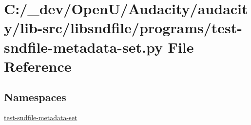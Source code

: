 \hypertarget{test-sndfile-metadata-set_8py}{}\section{C\+:/\+\_\+dev/\+Open\+U/\+Audacity/audacity/lib-\/src/libsndfile/programs/test-\/sndfile-\/metadata-\/set.py File Reference}
\label{test-sndfile-metadata-set_8py}
\subsection*{Namespaces}
\begin{DoxyCompactItemize}
\item 
 \hyperlink{namespacetest-sndfile-metadata-set}{test-\/sndfile-\/metadata-\/set}
\end{DoxyCompactItemize}
